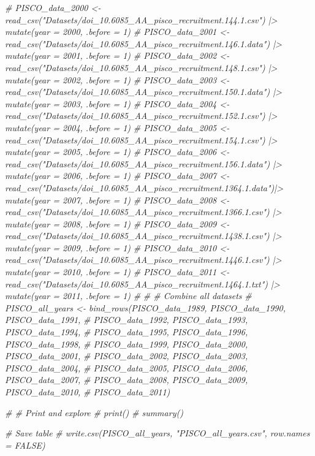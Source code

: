\documentclass[
]{article}
\newenvironment{Shaded}{\begin{snugshade}}{\end{snugshade}}
\newcommand{\CommentTok}[1]{\textcolor[rgb]{0.56,0.35,0.01}{\textit{#1}}}
\begin{document}
\begin{Shaded}
\begin{Highlighting}[]
\CommentTok{\# PISCO\_data\_2000 \textless{}{-} read\_csv("Datasets/doi\_10.6085\_AA\_pisco\_recruitment.144.1.csv")  |\textgreater{} mutate(year = 2000, .before = 1)}
\CommentTok{\# PISCO\_data\_2001 \textless{}{-} read\_csv("Datasets/doi\_10.6085\_AA\_pisco\_recruitment.146.1.data") |\textgreater{} mutate(year = 2001, .before = 1)}
\CommentTok{\# PISCO\_data\_2002 \textless{}{-} read\_csv("Datasets/doi\_10.6085\_AA\_pisco\_recruitment.148.1.csv")  |\textgreater{} mutate(year = 2002, .before = 1)}
\CommentTok{\# PISCO\_data\_2003 \textless{}{-} read\_csv("Datasets/doi\_10.6085\_AA\_pisco\_recruitment.150.1.data") |\textgreater{} mutate(year = 2003, .before = 1)}
\CommentTok{\# PISCO\_data\_2004 \textless{}{-} read\_csv("Datasets/doi\_10.6085\_AA\_pisco\_recruitment.152.1.csv")  |\textgreater{} mutate(year = 2004, .before = 1)}
\CommentTok{\# PISCO\_data\_2005 \textless{}{-} read\_csv("Datasets/doi\_10.6085\_AA\_pisco\_recruitment.154.1.csv")  |\textgreater{} mutate(year = 2005, .before = 1)}
\CommentTok{\# PISCO\_data\_2006 \textless{}{-} read\_csv("Datasets/doi\_10.6085\_AA\_pisco\_recruitment.156.1.data") |\textgreater{} mutate(year = 2006, .before = 1)}
\CommentTok{\# PISCO\_data\_2007 \textless{}{-} read\_csv("Datasets/doi\_10.6085\_AA\_pisco\_recruitment.1364.1.data")|\textgreater{} mutate(year = 2007, .before = 1)}
\CommentTok{\# PISCO\_data\_2008 \textless{}{-} read\_csv("Datasets/doi\_10.6085\_AA\_pisco\_recruitment.1366.1.csv") |\textgreater{} mutate(year = 2008, .before = 1)}
\CommentTok{\# PISCO\_data\_2009 \textless{}{-} read\_csv("Datasets/doi\_10.6085\_AA\_pisco\_recruitment.1438.1.csv") |\textgreater{} mutate(year = 2009, .before = 1)}
\CommentTok{\# PISCO\_data\_2010 \textless{}{-} read\_csv("Datasets/doi\_10.6085\_AA\_pisco\_recruitment.1446.1.csv") |\textgreater{} mutate(year = 2010, .before = 1)}
\CommentTok{\# PISCO\_data\_2011 \textless{}{-} read\_csv("Datasets/doi\_10.6085\_AA\_pisco\_recruitment.1464.1.txt") |\textgreater{} mutate(year = 2011, .before = 1)}
\CommentTok{\# }
\CommentTok{\# \# Combine all datasets}
\CommentTok{\# PISCO\_all\_years \textless{}{-} bind\_rows(PISCO\_data\_1989, PISCO\_data\_1990, PISCO\_data\_1991, }
\CommentTok{\#                              PISCO\_data\_1992, PISCO\_data\_1993, PISCO\_data\_1994, }
\CommentTok{\#                              PISCO\_data\_1995, PISCO\_data\_1996, PISCO\_data\_1998,}
\CommentTok{\#                              PISCO\_data\_1999, PISCO\_data\_2000, PISCO\_data\_2001,}
\CommentTok{\#                              PISCO\_data\_2002, PISCO\_data\_2003, PISCO\_data\_2004, }
\CommentTok{\#                              PISCO\_data\_2005, PISCO\_data\_2006, PISCO\_data\_2007, }
\CommentTok{\#                              PISCO\_data\_2008, PISCO\_data\_2009, PISCO\_data\_2010, }
\CommentTok{\#                              PISCO\_data\_2011)}

\CommentTok{\# \# Print and explore}
\CommentTok{\# print()}
\CommentTok{\# summary()}
 
\CommentTok{\# Save table}
\CommentTok{\# write.csv(PISCO\_all\_years, "PISCO\_all\_years.csv", row.names = FALSE)}
\end{Highlighting}
\end{Shaded}
\end{document}
